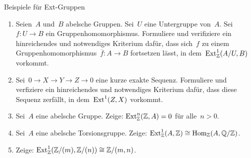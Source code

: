 \documentclass{uebblatt}
\begin{document}

\begin{aufgabe}{Beispiele für Ext-Gruppen}
\begin{enumerate}
\item Seien~$A$ und~$B$ abelsche Gruppen. Sei~$U$ eine Untergruppe
von~$A$. Sei~$f : U \to B$ ein Gruppenhomomorphismus. Formuliere und
verifiziere ein hinreichendes und notwendiges Kriterium dafür, dass sich~$f$ zu
einem Gruppenhomomorphismus~$\overline{f} : A \to B$ fortsetzen lässt, in
dem~$\mathrm{Ext}^1_{\mathbb{Z}}(A/U,B)$ vorkommt.
\item Sei~$0 \to X \to Y \to Z \to 0$ eine kurze exakte Sequenz. Formuliere und
verfiziere ein hinreichendes und notwendiges Kriterium dafür, dass diese
Sequenz zerfällt, in dem~$\mathrm{Ext}^1(Z,X)$ vorkommt.
\item Sei~$A$ eine abelsche Gruppe. Zeige: $\mathrm{Ext}^n_{\mathbb{Z}}(\mathbb{Z}, A) = 0$ für alle~$n > 0$.
\item Sei~$A$ eine abelsche Torsionsgruppe. Zeige: $\mathrm{Ext}^1_{\mathbb{Z}}(A,\mathbb{Z}) \cong
\mathrm{Hom}_{\mathbb{Z}}(A, \mathbb{Q}/\mathbb{Z})$.
\item Zeige: $\mathrm{Ext}^1_{\mathbb{Z}}(\mathbb{Z}/(m), \mathbb{Z}/(n)) \cong \mathbb{Z}/(m,n)$.
\end{enumerate}
\end{aufgabe}
\end{document}
